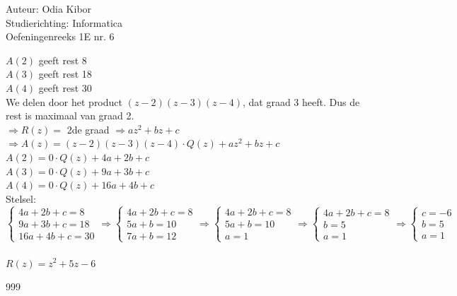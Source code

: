 \documentclass[a4paper]{article}
\begin{document}
  
\noindent \large Auteur: Odia Kibor \\
\noindent \large Studierichting: Informatica\\
\noindent \large Oefeningenreeks 1E nr. 6\\

\medskip

\normalsize

$A(2)$ geeft rest 8\\

$A(3)$ geeft rest 18\\

$A(4)$ geeft rest 30\\

We delen door het product $(z-2)(z-3)(z-4)$, dat graad 3 heeft.
Dus de rest is maximaal van graad 2.\\

$\Rightarrow R(z) = $ 2de graad $\Rightarrow  az^2 + bz + c$\\

$\Rightarrow A(z) = (z-2)(z-3)(z-4) \cdot Q(z) + az^2 + bz + c$\\

$A(2) = 0 \cdot Q(z) + 4a + 2b + c$\\

$A(3) = 0 \cdot Q(z) + 9a + 3b + c$\\

$A(4) = 0 \cdot Q(z) + 16a + 4b + c$\\

Stelsel:\\


$\left\{
	\begin{array}{l} 
		4a +2b + c = 8\\
		9a + 3b + c = 18\\
        16a + 4b + c = 30
	\end{array}
\right .
\Rightarrow
\left\{
	\begin{array}{l} 
		4a + 2b + c = 8\\
		5a + b = 10\\
        7a + b = 12
	\end{array}
\right .
\Rightarrow
\left\{
	\begin{array}{l} 
		4a + 2b + c = 8\\
        5a + b = 10\\
		a = 1
	\end{array}
\right .
\Rightarrow
\left\{
	\begin{array}{l} 
		4a + 2b + c = 8\\
        b = 5\\
		a = 1
	\end{array}
\right .
\Rightarrow
\left\{
	\begin{array}{l} 
		c = -6\\
        b = 5\\
		a = 1
	\end{array}
\right .$\\\\

$R(z) = z^2 + 5z - 6$









\begin{thebibliography}{999}
\end{thebibliography}
\end{document}
